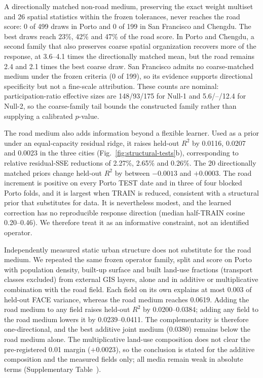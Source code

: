 \documentclass[11pt]{article}
\begin{document}
A directionally matched non-road medium, preserving the exact weight multiset and 26 spatial statistics within the frozen tolerances, never reaches the road score: 0 of 499 draws in Porto and 0 of 199 in San Francisco and Chengdu. The best draws reach 23\%, 42\% and 47\% of the road score. In Porto and Chengdu, a second family that also preserves coarse spatial organization recovers more of the response, at 3.6--4.1 times the directionally matched mean, but the road remains 2.4 and 2.1 times the best coarse draw. San Francisco admits no coarse-matched medium under the frozen criteria (0 of 199), so its evidence supports directional specificity but not a fine-scale attribution. These counts are nominal: participation-ratio effective sizes are 148/93/175 for Null-1 and 5.6/--/12.4 for Null-2, so the coarse-family tail bounds the constructed family rather than supplying a calibrated $p$-value.

The road medium also adds information beyond a flexible learner. Used as a prior under an equal-capacity residual ridge, it raises held-out $R^2$ by 0.0116, 0.0207 and 0.0023 in the three cities (Fig.~\ref{fig:structural-tests}b), corresponding to relative residual-SSE reductions of 2.27\%, 2.65\% and 0.26\%. The 20 directionally matched priors change held-out $R^2$ by between $-0.0013$ and $+0.0003$. The road increment is positive on every Porto TEST date and in three of four blocked Porto folds, and it is largest when TRAIN is reduced, consistent with a structural prior that substitutes for data. It is nevertheless modest, and the learned correction has no reproducible response direction (median half-TRAIN cosine 0.20--0.46). We therefore treat it as an informative constraint, not an identified operator.

Independently measured static urban structure does not substitute for the road medium. We repeated the same frozen operator family, split and score on Porto with population density, built-up surface and built land-use fractions (transport classes excluded) from external GIS layers, alone and in additive or multiplicative combination with the road field. Each field on its own explains at most 0.003 of held-out FACE variance, whereas the road medium reaches 0.0619. Adding the road medium to any field raises held-out $R^2$ by 0.0200--0.0384; adding any field to the road medium lowers it by 0.0239--0.0411. The complementarity is therefore one-directional, and the best additive joint medium (0.0380) remains below the road medium alone. The multiplicative land-use composition does not clear the pre-registered 0.01 margin ($+0.0023$), so the conclusion is stated for the additive composition and the measured fields only; all media remain weak in absolute terms (Supplementary Table~).
\end{document}
